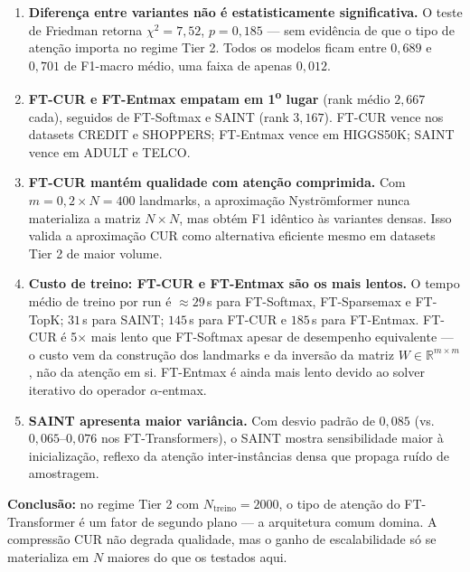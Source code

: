 \documentclass[12pt,a4paper]{article}
\begin{document}
\begin{enumerate}
  \item \textbf{Diferença entre variantes não é estatisticamente significativa.}
        O teste de Friedman retorna $\chi^2 = 7{,}52$, $p = 0{,}185$ --- sem
        evidência de que o tipo de atenção importa no regime Tier 2. Todos os
        modelos ficam entre $0{,}689$ e $0{,}701$ de F1-macro médio, uma faixa
        de apenas $0{,}012$.

  \item \textbf{FT-CUR e FT-Entmax empatam em 1\textsuperscript{o} lugar}
        (rank médio $2{,}667$ cada), seguidos de FT-Softmax e SAINT (rank
        $3{,}167$). FT-CUR vence nos datasets CREDIT e SHOPPERS; FT-Entmax
        vence em HIGGS50K; SAINT vence em ADULT e TELCO.

  \item \textbf{FT-CUR mantém qualidade com atenção comprimida.}
        Com $m = 0{,}2 \times N = 400$ landmarks, a aproximação Nyströmformer
        nunca materializa a matriz $N \times N$, mas obtém F1 idêntico às
        variantes densas. Isso valida a aproximação CUR como alternativa
        eficiente mesmo em datasets Tier 2 de maior volume.

  \item \textbf{Custo de treino: FT-CUR e FT-Entmax são os mais lentos.}
        O tempo médio de treino por run é $\approx 29$\,s para FT-Softmax,
        FT-Sparsemax e FT-TopK; $31$\,s para SAINT; $145$\,s para FT-CUR e
        $185$\,s para FT-Entmax. FT-CUR é 5$\times$ mais lento que FT-Softmax
        apesar de desempenho equivalente --- o custo vem da construção dos
        landmarks e da inversão da matriz $W \in \mathbb{R}^{m \times m}$,
        não da atenção em si. FT-Entmax é ainda mais lento devido ao solver
        iterativo do operador $\alpha$-entmax.

  \item \textbf{SAINT apresenta maior variância.} Com desvio padrão de
        $0{,}085$ (vs.\ $0{,}065$--$0{,}076$ nos FT-Transformers), o SAINT
        mostra sensibilidade maior à inicialização, reflexo da atenção
        inter-instâncias densa que propaga ruído de amostragem.
\end{enumerate}

\textbf{Conclusão:} no regime Tier 2 com $N_{\text{treino}}=2000$, o tipo
de atenção do FT-Transformer é um fator de segundo plano --- a arquitetura
comum domina. A compressão CUR não degrada qualidade, mas o ganho de
escalabilidade só se materializa em $N$ maiores do que os testados aqui.
\end{document}
